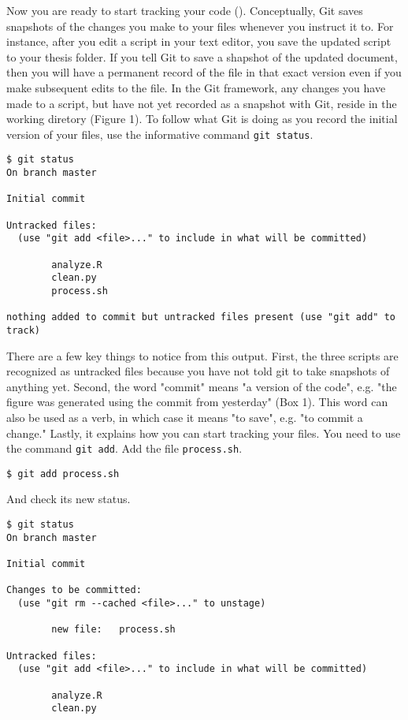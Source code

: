 Now you are ready to start tracking your code (\label{fig:Fig1}).
Conceptually, Git saves snapshots of the changes you make to your files whenever you instruct it to.
For instance, after you edit a script in your text editor, you save the updated script to your thesis folder.
If you tell Git to save a shapshot of the updated document, then you will have a permanent record of the file in that exact version even if you make subsequent edits to the file.
In the Git framework, any changes you have made to a script, but have not yet recorded as a snapshot with Git, reside in the working diretory (Figure 1).
To follow what Git is doing as you record the initial version of your files, use the informative command \verb|git status|.

\begin{lstlisting}
$ git status
On branch master

Initial commit

Untracked files:
  (use "git add <file>..." to include in what will be committed)

        analyze.R
        clean.py
        process.sh

nothing added to commit but untracked files present (use "git add" to track)
\end{lstlisting}

There are a few key things to notice from this output.
First, the three scripts are recognized as untracked files because you have not told git to take snapshots of anything yet.
Second, the word "commit" means "a version of the code", e.g. "the figure was generated using the commit from yesterday" (Box 1).
This word can also be used as a verb, in which case it means "to save", e.g. "to commit a change."
Lastly, it explains how you can start tracking your files.
You need to use the command \verb|git add|.
Add the file \verb|process.sh|.

\begin{lstlisting}
$ git add process.sh
\end{lstlisting}

And check its new status.

\begin{lstlisting}
$ git status
On branch master

Initial commit

Changes to be committed:
  (use "git rm --cached <file>..." to unstage)

        new file:   process.sh

Untracked files:
  (use "git add <file>..." to include in what will be committed)

        analyze.R
        clean.py
\end{lstlisting}

